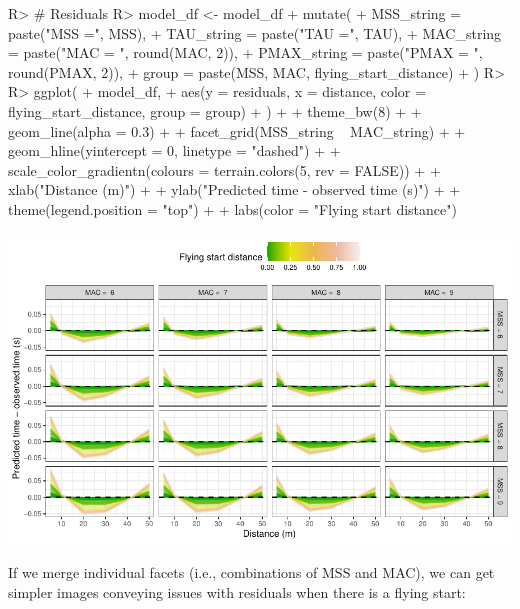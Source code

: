 \documentclass[
]{jss}
\begin{document}
\begin{CodeChunk}
\begin{CodeInput}
R> # Residuals
R> model_df <- model_df %
+   mutate(
+     MSS_string = paste("MSS =", MSS),
+     TAU_string = paste("TAU =", TAU),
+     MAC_string = paste("MAC = ", round(MAC, 2)),
+     PMAX_string = paste("PMAX = ", round(PMAX, 2)),
+     group = paste(MSS, MAC, flying_start_distance)
+   )
R> 
R> ggplot(
+   model_df,
+   aes(y = residuals, x = distance, color = flying_start_distance, group = group)
+ ) +
+   theme_bw(8) +
+   geom_line(alpha = 0.3) +
+   facet_grid(MSS_string ~ MAC_string) +
+   geom_hline(yintercept = 0, linetype = "dashed") +
+   scale_color_gradientn(colours = terrain.colors(5, rev = FALSE)) +
+   xlab("Distance (m)") +
+   ylab("Predicted time - observed time (s)") +
+   theme(legend.position = "top") + 
+   labs(color = "Flying start distance")
\end{CodeInput}


\begin{center}\includegraphics[width=1\linewidth]{paper_files/figure-latex/unnamed-chunk-27-1} \end{center}

\end{CodeChunk}

If we merge individual facets (i.e., combinations of MSS and MAC), we can get simpler images conveying issues with residuals when there is a flying start:
\end{document}
